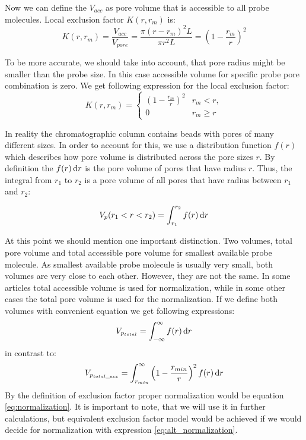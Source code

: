 Now we can define the $V_{acc}$ as pore volume that is accessible to all probe
molecules. Local exclusion factor $K(r, r_m)$ is:
\begin{equation}
    K(r, r_m) = \frac{V_{acc}}{V_{pore}} = \frac{\pi (r-r_m)^2 L}{\pi r^2 L} = \left(1 -
    \frac{r_m}{r}\right)^2
\end{equation}

To be more accurate, we should take into account, that pore radius might be smaller
than the probe size. In this case accessible volume for specific probe pore
combination is zero. We get following expression for the local exclusion
factor:
\begin{equation}\label{eq:local_ex_coeff}
    K(r, r_m) =
    \begin{cases}
        \left(1 - \frac{r_m}{r}\right)^2 & r_m < r,   \\
        0                                & r_m \geq r
    \end{cases}
\end{equation}


In reality the chromatographic column contains beads with pores of many
different sizes. In order to account for this, we use a distribution function
$f(r)$ which describes how pore volume is distributed across the pore sizes $r$.
By definition the $f(r)\,\mathrm{d} r$ is the pore volume of pores that have radius $r$.
Thus, the integral from $r_1$ to $r_2$ is a pore volume of all pores that have
radius between $r_1$ and $r_2$:

\begin{equation}
    V_p(r_1 < r < r_2) = \int_{r_1}^{r_2}f(r)\,\mathrm{d} r
\end{equation}

At this point we should mention one important distinction. Two volumes, total
pore volume and total accessible pore volume for smallest available probe
molecule. As smallest available probe molecule is usually very small, both
volumes are very close to each other.
However, they are not the same. In some articles total accessible volume is used
for normalization, while in some other cases the total pore volume is used for
the normalization. If we define both volumes with convenient equation we get
following expressions:
\begin{equation}\label{eq:normalization}
    V_{p_{total}} = \int_{-\infty}^{\infty}f(r)\,\mathrm{d} r
\end{equation}
in contrast to:
\begin{equation}\label{eq:alt_normalization}
    V_{p_{total\_acc}} =
    \int_{r_{min}}^{\infty}\left(1-\frac{r_{min}}{r}\right)^2f(r)\,\mathrm{d} r
\end{equation}
By the definition of exclusion factor proper normalization would be equation
\ref{eq:normalization}. It is important to note, that we will use it in further
calculations, but equivalent exclusion factor model would be achieved if we
would decide for normalization with expression \ref{eq:alt_normalization}.

